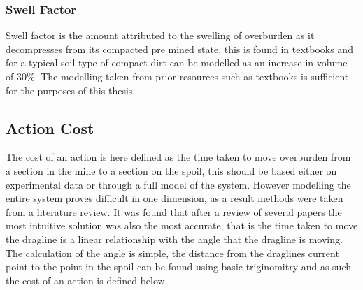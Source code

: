 \subsubsection{Swell Factor}
Swell factor is the amount attributed to the swelling of overburden as it decompresses from its compacted pre mined state, this is found in textbooks and for a typical soil type of compact dirt can be modelled as an increase in volume of 30\%. The modelling taken from prior resources such as textbooks is sufficient for the purposes of this thesis.

	

\subsection{Action Cost}
The cost of an action is here defined as the time taken to move overburden from a section in the mine to a section on the spoil, this should be based either on experimental data or through a full model of the system. However modelling the entire system proves difficult in one dimension, as a result methods were taken from a literature review. It was found that after a review of several papers the most intuitive solution was also the most accurate, that is the time taken to move the dragline is a linear relationship with the angle that the dragline is moving. \\The calculation of the angle is simple, the distance from the draglines current point to the point in the spoil can be found using basic triginomitry and as such the cost of an action is defined below. 

